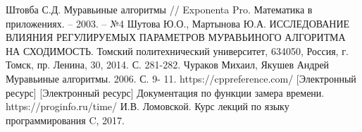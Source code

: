 \documentclass[12pt, a4paper]{report}
\begin{document}
    \begin{thebibliography}{9}
    	 Штовба С.Д. Муравьиные алгоритмы // Exponenta Pro. Математика в приложениях. – 2003. – №4
    	 Шутова Ю.О., Мартынова Ю.А. ИССЛЕДОВАНИЕ ВЛИЯНИЯ РЕГУЛИРУЕМЫХ ПАРАМЕТРОВ МУРАВЬИНОГО АЛГОРИТМА НА СХОДИМОСТЬ. Томский политехнический университет, 634050, Россия, г. Томск, пр. Ленина, 30, 2014. С. 281-282.
    	 Чураков Михаил, Якушев Андрей Муравьиные алгоритмы. 2006. С. 9-
    	11.
    	 https://cppreference.com/ [Электронный ресурс]
    	[Электронный ресурс] Документация по функции замера времени. https://proginfo.ru/time/
    	И.В. Ломовской. Курс лекций по языку программирования C, 2017.
    \end{thebibliography}
\end{document}
